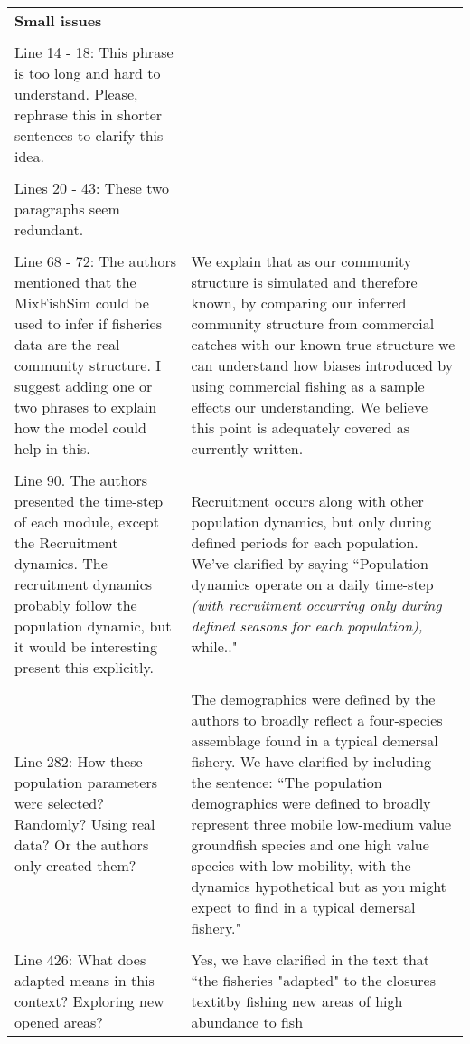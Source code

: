 \documentclass[10pt]{letter}
\begin{document}
\begin{landscape}
\begin{center}
\begin{longtable}{p{12cm} | p{12cm}}
		\hline

	\textbf{Small issues} &  \\
\\
Line 14 - 18: This phrase is too long and hard to understand. Please, rephrase
this in shorter sentences to clarify this idea. & \\
\\
Lines 20 - 43: These two paragraphs seem redundant.  & \\
\\
Line 68 - 72: The authors mentioned that the MixFishSim could be used to infer
if fisheries data are the real community structure. I suggest adding one or two
phrases to explain how the model could help in this. & We explain that as our
community structure is simulated and therefore known, by comparing our inferred
community structure from commercial catches with our known true structure we
can understand how biases introduced by using commercial fishing as a sample
effects our understanding. We believe this point is adequately covered as
currently written.\\
\\
Line 90. The authors presented the time-step of each module, except the
Recruitment dynamics. The recruitment dynamics probably follow the population
dynamic, but it would be interesting present this explicitly. & Recruitment
occurs along with other population dynamics, but only during defined periods
for each population. We've clarified by saying ``Population dynamics operate on
a daily time-step \textit{(with recruitment occurring only during defined
	seasons for each population),} while.." \\
\\
Line 282: How these population parameters were selected? Randomly? Using real
data? Or the authors only created them? & The demographics were defined by the
authors to broadly reflect a four-species assemblage found in a typical
demersal fishery. We have clarified by including the sentence:  ``The population
demographics were defined to broadly represent three mobile low-medium value
groundfish species and one high value species with low mobility, with the
dynamics hypothetical but as you might expect to find in a typical demersal
fishery." \\ 
\\ 
Line 426: What does adapted means in this context? Exploring
new opened areas?
& Yes, we have clarified in the text that ``the fisheries "adapted" to the
closures textit{by fishing new areas of high abundance to fish}\\

\end{longtable}
\end{center}
\end{landscape}
\end{document}

